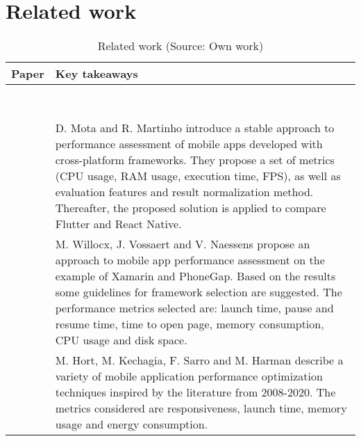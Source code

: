 
\chapter{Related work}

\begin{table}[h]
	\centering
    \caption{Related work (Source: Own work)}
    \label{tab:related_work}
	\begin{tabular}{ |c|p{}| }
		\hline
        \textbf{Paper}&\textbf{Key takeaways}\\
        \hline
        \cite{comparison_perf_looks_flutter_native}&\\
        \hline
        \cite{eval_rn_flutter}&\\
        \hline
        \cite{cross_platform_development_study_rn_flutter}&\\
        \hline
        \cite{comparison_technologies_multiplatform}&\\
        \hline
        \cite{denko_comp_hybrid}&\\
        \hline
        \cite{comp_analysis_hybrid_frameworks}&\\
        \hline
        \cite{bialkowski_eval_flutter}&\\
        \hline
        \cite{kocki_comp_hybrid_ios}&\\
        \hline
        \cite{approach_to_assess_performance_case_study}&D. Mota and R. Martinho introduce a stable approach to performance assessment of mobile apps developed with cross-platform frameworks. They propose a set of metrics (CPU usage, RAM usage, execution time, FPS), as well as evaluation features and result normalization method. Thereafter, the proposed solution is applied to compare Flutter and React Native. \\
        \hline
        \cite{willocx_quantative_perf}&M. Willocx, J. Vossaert and V. Naessens propose an approach to mobile app performance assessment on the example of Xamarin and PhoneGap. Based on the results some guidelines for framework selection are suggested. The performance metrics selected are: launch time, pause and resume time, time to open page, memory consumption, CPU usage and disk space.\\
        \hline
        \cite{hort_survey_perf_optimization}&M. Hort, M. Kechagia, F. Sarro and M. Harman describe a variety of mobile application performance optimization techniques inspired by the literature from 2008-2020. The metrics considered are responsiveness, launch time, memory usage and energy consumption.\\

\end{tabular}
\end{table}
